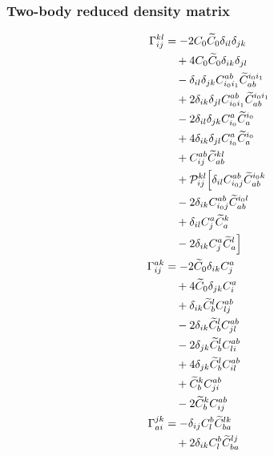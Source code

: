\subsubsection{Two-body reduced density matrix}
\begin{align*}
\Gamma^{kl}_{ij} &= -  2 C_{0} \widetilde{C}_{0} \delta_{i l} \delta_{j k}  \\
  &\quad  + 4 C_{0} \widetilde{C}_{0} \delta_{i k} \delta_{j l}  \\
  &\quad -  \delta_{i l} \delta_{j k} C^{ab}_{i_{0}i_{1}}  \widetilde{C}^{i_{0}i_{1}}_{ab}  \\
  &\quad  + 2 \delta_{i k} \delta_{j l} C^{ab}_{i_{0}i_{1}}  \widetilde{C}^{i_{0}i_{1}}_{ab}  \\
  &\quad -  2 \delta_{i l} \delta_{j k} C^{a}_{i_{0}}  \widetilde{C}^{i_{0}}_{a}  \\
  &\quad  + 4 \delta_{i k} \delta_{j l} C^{a}_{i_{0}}  \widetilde{C}^{i_{0}}_{a}  \\
  &\quad  + C^{ab}_{ij}  \widetilde{C}^{kl}_{ab} \\
  &\quad + \mathcal{P}^{kl}_{ij}\Bigl[ \delta_{i l} C^{ab}_{i_{0}j}  \widetilde{C}^{i_{0}k}_{ab}  \\
  &\quad -  2 \delta_{i k} C^{ab}_{i_{0}j}  \widetilde{C}^{i_{0}l}_{ab}  \\
  &\quad  + \delta_{i l} C^{a}_{j}  \widetilde{C}^{k}_{a}  \\
  &\quad -  2 \delta_{i k} C^{a}_{j}  \widetilde{C}^{l}_{a} \Bigr] \\
\Gamma^{ak}_{ij} &= -  2 \widetilde{C}_{0} \delta_{i k} C^{a}_{j}  \\
  &\quad  + 4 \widetilde{C}_{0} \delta_{j k} C^{a}_{i}  \\
  &\quad  + \delta_{i k} \widetilde{C}^{l}_{b}  C^{ab}_{lj}  \\
  &\quad -  2 \delta_{i k} \widetilde{C}^{l}_{b}  C^{ab}_{jl}  \\
  &\quad -  2 \delta_{j k} \widetilde{C}^{l}_{b}  C^{ab}_{li}  \\
  &\quad  + 4 \delta_{j k} \widetilde{C}^{l}_{b}  C^{ab}_{il}  \\
  &\quad  + \widetilde{C}^{k}_{b}  C^{ab}_{ji}  \\
  &\quad - 2 \widetilde{C}^{k}_{b}  C^{ab}_{ij} \\
\Gamma^{jk}_{ai} &= -  \delta_{i j} C^{b}_{l}  \widetilde{C}^{lk}_{ba}  \\
  &\quad  + 2 \delta_{i k} C^{b}_{l}  \widetilde{C}^{lj}_{ba}  \\

\end{align*}

